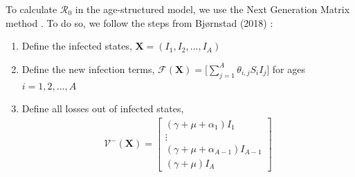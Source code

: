 \documentclass[12pt]{article}
\newcommand{\Rn}{{\mathcal R}_0}
\begin{document}
To calculate $\Rn$ in the age-structured model, we use the Next Generation Matrix method \citep{DiekmannEtAl1990}. To do so, we follow the steps from Bj\o{}rnstad (2018) \cite{Bjornstad2018}:
\begin{enumerate}
    \item Define the infected states, $\mathbf{X} = (I_1, I_2, ..., I_A)$
    \item Define the new infection terms, $\mathcal{F}(\mathbf{X}) = \Big[ \sum_{j=1}^{A} \theta_{i,j} S_i I_j  \Big]$ for ages $i = 1, 2, ..., A$
    \item Define all losses out of infected states, 
    \begin{align*}
        \mathcal{V}^-(\mathbf{X}) = \begin{bmatrix}
        (\gamma + \mu + \alpha_1) I_1 \\
        \vdots \\
        (\gamma + \mu + \alpha_{A-1}) I_{A-1} \\
        (\gamma + \mu) I_A
        \end{bmatrix}
    \end{align*}


\end{enumerate}
\end{document}
